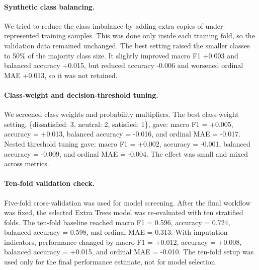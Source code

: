 ﻿\documentclass[11pt]{article}
\begin{document}
{\paragraph{Synthetic class balancing.} We tried to reduce the class imbalance by adding extra copies of under-represented training samples. This was done only inside each training fold, so the validation data remained unchanged. The best setting raised the smaller classes to 50\% of the majority class size. It slightly improved macro F1 +0.003 and balanced accuracy +0.015, but reduced accuracy -0.006 and worsened ordinal MAE +0.013, so it was not retained.

\paragraph{Class-weight and decision-threshold tuning.} We screened class weights and probability multipliers. The best class-weight setting, \{dissatisfied: 3, neutral: 2, satisfied: 1\}, gave: macro F1 = +0.005, accuracy = +0.013, balanced accuracy = -0.016, and ordinal MAE = -0.017. Nested threshold tuning gave: macro F1 = +0.002, accuracy = -0.001, balanced accuracy = -0.009, and ordinal MAE = -0.004. The effect was small and mixed across metrics.

\paragraph{Ten-fold validation check.} Five-fold cross-validation was used for model screening. After the final workflow was fixed, the selected Extra Trees model was re-evaluated with ten stratified folds. The ten-fold baseline reached macro F1 = 0.596, accuracy = 0.724, balanced accuracy = 0.598, and ordinal MAE = 0.313. With imputation indicators, performance changed by macro F1 = +0.012, accuracy = +0.008, balanced accuracy = +0.015, and ordinal MAE = -0.010. The ten-fold setup was used only for the final performance estimate, not for model selection.


}
\end{document}
